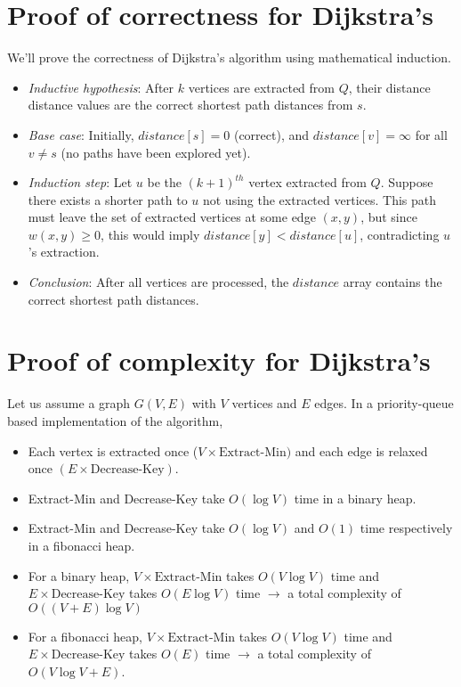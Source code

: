 \begin{appendices}
	\section{Proof of correctness for Dijkstra's}\label{appendix:dijkstra:correctness}
	We'll prove the correctness of Dijkstra's algorithm using mathematical induction.
	\begin{itemize}
		\item \textit{Inductive hypothesis}: After $k$ vertices are extracted from $Q$, their distance distance values are the correct shortest path distances from $s$.
		\item \textit{Base case}: Initially, $distance[s]=0$ (correct), and $distance[v]=\infty$ for all $v \neq s$ (no paths have been explored yet).
		\item \textit{Induction step}: Let $u$ be the $(k+1)^{th}$ vertex extracted from $Q$. Suppose there exists a shorter path to $u$ not using the extracted vertices. This path must leave the set of extracted vertices at some edge $(x,y)$, but since $w(x,y) \geq 0$, this would imply $distance[y]<distance[u]$, contradicting $u$’s extraction.
		\item \textit{Conclusion}: After all vertices are processed, the $distance$ array contains the correct shortest path distances.
	\end{itemize}
	\section{Proof of complexity for Dijkstra's}\label{appendix:dijkstra:complexity}
	Let us assume a graph $G(V, E)$ with $V$ vertices and $E$ edges. In a priority-queue based implementation of the algorithm,
	\begin{itemize}
		\item Each vertex is extracted once ($V \times \mbox{Extract-Min})$ and each edge is relaxed once $(E \times \mbox{Decrease-Key})$.
		\item Extract-Min and Decrease-Key take $O(\log{V})$ time in a binary heap.
		\item Extract-Min and Decrease-Key take $O(\log{V})$ and $O(1)$ time respectively in a fibonacci heap.
		\item For a binary heap, $V \times \mbox{Extract-Min}$ takes $O(V\log{V})$ time and $E \times \mbox{Decrease-Key}$ takes $O(E\log{V})$ time $\to$ a total complexity of $O((V + E)\log{V})$
		\item For a fibonacci heap, $V \times \mbox{Extract-Min}$ takes $O(V\log{V})$ time and $E \times \mbox{Decrease-Key}$ takes $O(E)$ time $\to$ a total complexity of $O(V\log{V} + E)$.
	\end{itemize}

\end{appendices}
